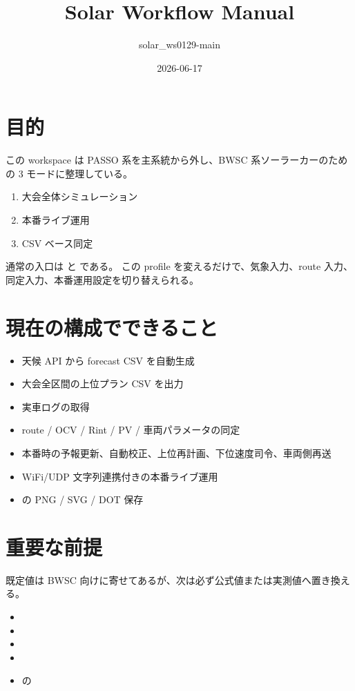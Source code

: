 \documentclass[a4paper,11pt]{article}
\title{Solar Workflow Manual}
\author{solar\_ws0129-main}
\date{2026-06-17}
\begin{document}
\maketitle

\section{目的}

この workspace は PASSO 系を主系統から外し、BWSC 系ソーラーカーのための 3 モードに整理している。

\begin{enumerate}
  \item 大会全体シミュレーション
  \item 本番ライブ運用
  \item CSV ベース同定
\end{enumerate}

通常の入口は  と  である。
この profile を変えるだけで、気象入力、route 入力、同定入力、本番運用設定を切り替えられる。

\section{現在の構成でできること}

\begin{itemize}
  \item 天候 API から forecast CSV を自動生成
  \item 大会全区間の上位プラン CSV を出力
  \item 実車ログの取得
  \item route / OCV / Rint / PV / 車両パラメータの同定
  \item 本番時の予報更新、自動校正、上位再計画、下位速度司令、車両側再送
  \item WiFi/UDP 文字列連携付きの本番ライブ運用
  \item {} の PNG / SVG / DOT 保存
\end{itemize}

\section{重要な前提}

既定値は BWSC 向けに寄せてあるが、次は必ず公式値または実測値へ置き換える。

\begin{itemize}
  \item {}
  \item {}
  \item {}
  \item {}
  \item {} の 
\end{itemize}
\end{document}
